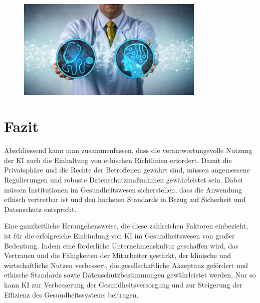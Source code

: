 \begin{figure}[h]
    \centering 
    \includegraphics[width=0.8\textwidth]{KI-Gesundheit.jpg}
    \end{figure}


\section{Fazit}
Abschliessend kann man zusammenfassen, dass die verantwortungsvolle Nutzung der KI auch die Einhaltung von ethischen Richtlinien erfordert. Damit die Privatsphäre und die Rechte der Betroffenen gewährt sind, müssen angemessene Regulierungen und robuste Datenschutzmaßnahmen gewährleistet sein. Dabei müssen Institutionen im Gesundheitswesen sicherstellen, dass die Anwendung ethisch vertretbar ist und den höchsten Standards in Bezug auf Sicherheit und Datenschutz entspricht.

\vspace{1mm}Eine ganzheitliche Herangehensweise, die diese zahlreichen Faktoren einbezieht, ist für die erfolgreiche Einbindung von KI im Gesundheitswesen von großer Bedeutung. Indem eine förderliche Unternehmenskultur geschaffen wird, das Vertrauen und die Fähigkeiten der Mitarbeiter gestärkt, der klinische und wirtschaftliche Nutzen verbessert, die gesellschaftliche Akzeptanz gefördert und ethische Standards sowie Datenschutzbestimmungen gewährleistet werden. Nur so kann KI zur Verbesserung der Gesundheitsversorgung und zur Steigerung der Effizienz des Gesundheitssystems beitragen.

\citep{pwc-de}

